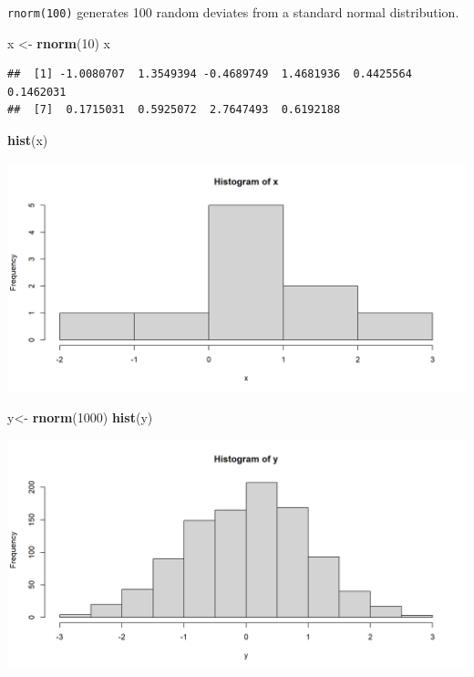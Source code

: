 \documentclass[
]{book}
\newenvironment{Shaded}{\begin{snugshade}}{\end{snugshade}}
\newcommand{\DecValTok}[1]{\textcolor[rgb]{0.00,0.00,0.81}{#1}}
\newcommand{\FunctionTok}[1]{\textcolor[rgb]{0.13,0.29,0.53}{\textbf{#1}}}
\newcommand{\NormalTok}[1]{#1}
\newcommand{\OtherTok}[1]{\textcolor[rgb]{0.56,0.35,0.01}{#1}}
\begin{document}
\texttt{rnorm(100)} generates 100 random deviates from a standard normal distribution.

\begin{Shaded}
\begin{Highlighting}[]
\NormalTok{x }\OtherTok{\textless{}{-}} \FunctionTok{rnorm}\NormalTok{(}\DecValTok{10}\NormalTok{)}
\NormalTok{x}
\end{Highlighting}
\end{Shaded}

\begin{verbatim}
##  [1] -1.0080707  1.3549394 -0.4689749  1.4681936  0.4425564  0.1462031
##  [7]  0.1715031  0.5925072  2.7647493  0.6192188
\end{verbatim}

\begin{Shaded}
\begin{Highlighting}[]
\FunctionTok{hist}\NormalTok{(x)}
\end{Highlighting}
\end{Shaded}

\begin{center}\includegraphics{figure/unnamed-chunk-18-1} \end{center}

\begin{Shaded}
\begin{Highlighting}[]
\NormalTok{y}\OtherTok{\textless{}{-}} \FunctionTok{rnorm}\NormalTok{(}\DecValTok{1000}\NormalTok{)}
\FunctionTok{hist}\NormalTok{(y)}
\end{Highlighting}
\end{Shaded}

\begin{center}\includegraphics{figure/unnamed-chunk-19-1} \end{center}
\end{document}
